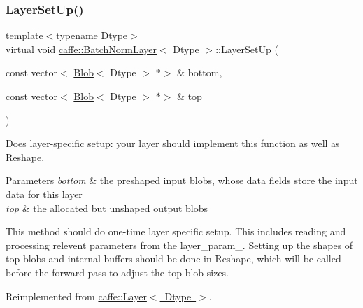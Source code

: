 \subsubsection{\texorpdfstring{Layer\+Set\+Up()}{LayerSetUp()}\hspace{0.1cm}{\footnotesize\ttfamily [2/2]}}
{\footnotesize\ttfamily template$<$typename Dtype$>$ \\
virtual void \mbox{\hyperlink{classcaffe_1_1_batch_norm_layer}{caffe\+::\+Batch\+Norm\+Layer}}$<$ Dtype $>$\+::Layer\+Set\+Up (\begin{DoxyParamCaption}\item[{const vector$<$ \mbox{\hyperlink{classcaffe_1_1_blob}{Blob}}$<$ Dtype $>$ $\ast$$>$ \&}]{bottom,  }\item[{const vector$<$ \mbox{\hyperlink{classcaffe_1_1_blob}{Blob}}$<$ Dtype $>$ $\ast$$>$ \&}]{top }\end{DoxyParamCaption})\hspace{0.3cm}{\ttfamily [virtual]}}



Does layer-\/specific setup\+: your layer should implement this function as well as Reshape. 


\begin{DoxyParams}{Parameters}
{\em bottom} & the preshaped input blobs, whose data fields store the input data for this layer \\
\hline
{\em top} & the allocated but unshaped output blobs\\
\hline
\end{DoxyParams}
This method should do one-\/time layer specific setup. This includes reading and processing relevent parameters from the {\ttfamily layer\+\_\+param\+\_\+}. Setting up the shapes of top blobs and internal buffers should be done in {\ttfamily Reshape}, which will be called before the forward pass to adjust the top blob sizes. 

Reimplemented from \mbox{\hyperlink{classcaffe_1_1_layer_a481323a3e0972c682787f2137468c29f}{caffe\+::\+Layer$<$ Dtype $>$}}.

\mbox{\label{classcaffe_1_1_batch_norm_layer_a1acd542fe8fe89d88db9050d048fc7d2}} 
